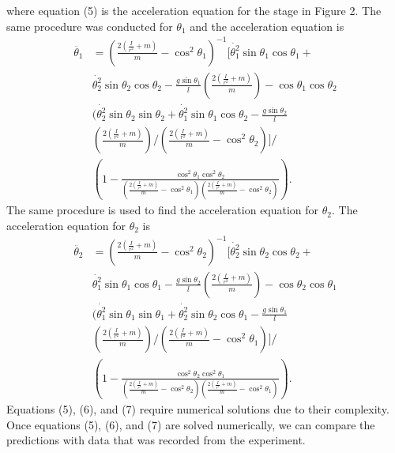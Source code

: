 \documentclass[twocolumn]{article}
\begin{document}
where equation (5) is the acceleration equation for the stage in Figure 2. The same procedure was conducted for $\theta_{1}$ and the acceleration equation is
\begin{equation}\label{6}
\begin{split}
\ddot{\theta_{1}}&=(\frac{2(\frac{I}{r^2}+m)}{m}-\cos^2{\theta_1})^{-1}[\dot{\theta_{1}^2}\sin{\theta_{1}}\cos{\theta_{1}}+\\&
\dot{\theta_{2}^2}\sin{\theta_{2}}\cos{\theta_{2}}-\frac{g\sin{\theta_{1}}}{l}(\frac{2(\frac{I}{r^2}+m)}{m})-\cos{\theta_{1}}\cos{\theta_{2}} \\&
(\dot{\theta_{2}^2}\sin{\theta_{2}}\sin{\theta_{2}}+\dot{\theta_{1}^2}\sin{\theta_{1}}\cos{\theta_{2}}-\frac{g\sin{\theta_{2}}}{l} \\&
(\frac{2(\frac{I}{r^2}+m)}{m})/(\frac{2(\frac{I}{r^2}+m)}{m}-\cos^2{\theta_2})]/ \\&
(1-\frac{\cos^2{\theta_{1}}\cos^2{\theta_{2}}}{(\frac{2(\frac{I}{r^2}+m)}{m}-\cos^2{\theta_1})(\frac{2(\frac{I}{r^2}+m)}{m}-\cos^2{\theta_2})}).
\end{split}
\end{equation}
The same procedure is used to find the acceleration equation for $\theta_{2}$. The acceleration equation for $\theta_{2}$ is
\begin{equation}\label{7}
\begin{split}
\ddot{\theta_{2}}&=(\frac{2(\frac{I}{r^2}+m)}{m}-\cos^2{\theta_{2}})^{-1}[\dot{\theta_{2}^2}\sin{\theta_{2}}\cos{\theta_{2}}+\\&
\dot{\theta_{1}^2}\sin{\theta_{1}}\cos{\theta_{1}}-\frac{g\sin{\theta_{2}}}{l}(\frac{2(\frac{I}{r^2}+m)}{m})-\cos{\theta_{2}}\cos{\theta_{1}} \\&
(\dot{\theta_{1}^2}\sin{\theta_{1}}\sin{\theta_{1}}+\dot{\theta_{2}^2}\sin{\theta_{2}}\cos{\theta_{1}}-\frac{g\sin{\theta_{1}}}{l} \\&
(\frac{2(\frac{I}{r^2}+m)}{m})/(\frac{2(\frac{I}{r^2}+m)}{m}-\cos^2{\theta_1})]/ \\&
(1-\frac{\cos^2{\theta_{2}}\cos^2{\theta_{1}}}{(\frac{2(\frac{I}{r^2}+m)}{m}-\cos^2{\theta_2})(\frac{2(\frac{I}{r^2}+m)}{m}-\cos^2{\theta_1})}).
\end{split}
\end{equation}
Equations (5), (6), and (7) require numerical solutions due to their complexity. Once equations (5), (6), and (7) are solved numerically, we can compare the predictions with data that was recorded from the experiment.
\end{document}
